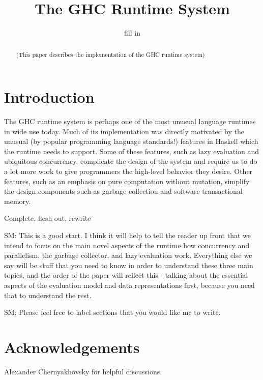 \documentclass{jfp1}
\title{The GHC Runtime System}
\author{fill in}
\newcommand{\Red}[1]{{\color{red} #1}}
\newcommand{\SM}[1]{{\color{green} SM: #1}}
\begin{document}
\maketitle

\begin{abstract}
(This paper describes the implementation of the GHC runtime system)
\end{abstract}

\tableofcontents

\section{Introduction}

The GHC runtime system is perhaps one of the most unusual language
runtimes in wide use today.  Much of its implementation was directly
motivated by the unusual (by popular programming language standards!)
features in Haskell which the runtime needs to support.  Some of these
features, such as lazy evaluation and ubiquitous concurrency, complicate
the design of the system and require us to do a lot more work to give
programmers the high-level behavior they desire.  Other features, such
as an emphasis on pure computation without mutation, simplify the design
components such as garbage collection and software transactional memory.

\Red{Complete, flesh out, rewrite}

\SM{This is a good start.  I think it will help to tell the reader up
  front that we intend to focus on the main novel aspects of the
  runtime how concurrency and parallelism, the garbage collector, and
  lazy evaluation work.  Everything else we say will be stuff that you
  need to know in order to understand these three main topics, and the
  order of the paper will reflect this - talking about the essential
  aspects of the evaluation model and data representations first,
  because you need that to understand the rest.}

\SM{Please feel free to label sections that you would like me to
  write.}





\section{Acknowledgements}

Alexander Chernyakhovsky for helpful discussions.



\end{document}
